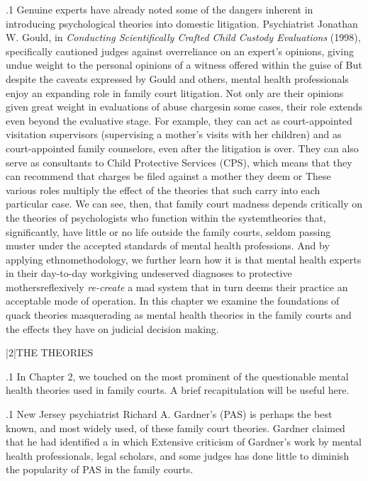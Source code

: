 \documentclass[11pt, twoside]{article}
\begin{document}
{\p.1{%
Genuine experts have already noted some of the dangers inherent
in introducing psychological theories into domestic litigation. Psychiatrist Jonathan W. Gould, in \textit{Conducting Scientifically Crafted Child
Custody Evaluations} (1998), specifically cautioned judges
against overreliance on an expert’s opinions, giving undue weight to the personal
opinions of a witness offered within the guise of  But despite the caveats expressed by Gould and others, mental
health professionals enjoy an expanding role in family court litigation.
Not only are their opinions given great weight in evaluations of abuse
charges\mdash{}in some cases, their role extends even beyond the evaluative
stage. For example, they can act as court-appointed visitation
supervisors (supervising a mother’s visits with her children)
and as court-appointed
family counselors, even after the litigation is over. They can also
serve as consultants to Child Protective Services (CPS), which means
that they can recommend that charges be filed against a mother they
deem  or  These various roles multiply the effect
of the theories that such  carry into each particular case.
We can see, then, that family court madness depends critically on
the theories of psychologists who function within the system\mdash{}theories
that, significantly, have little or no life outside the family courts, seldom
passing muster under the accepted standards of mental health professions. And by applying ethnomethodology, we further learn how it is
that mental health experts in their day-to-day work\mdash{}giving undeserved
diagnoses to protective mothers\mdash{}reflexively \textit{re-create} a mad system that
in turn deems their practice an acceptable mode of operation.
In this chapter we examine the foundations of quack theories masquerading as mental health theories in the family courts and the effects
they have on judicial decision making.
}%


\s|2|{THE THEORIES}

\p.1{%
\noindent{}In Chapter 2, we touched on the most prominent of the questionable
mental health theories used in family courts. A brief recapitulation will
be useful here.
}%

\p.1{%
New Jersey psychiatrist Richard A. Gardner’s  (PAS) is perhaps the best known, and most widely used,
of these family court theories. Gardner claimed that he had identified
a  in which  Extensive criticism of Gardner’s work by mental health professionals, legal scholars, and some judges has done little to diminish the
popularity of PAS in the family courts.
}%

}
\end{document}
